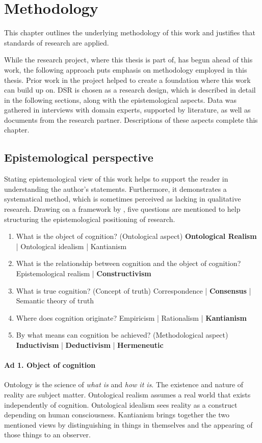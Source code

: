 \chapter{Methodology}
This chapter outlines the underlying methodology of this work and justifies that standards of research are applied. 

While the research project, where this thesis is part of, has begun ahead of this work, the following approach puts emphasis on methodology employed in this thesis. Prior work in the project helped to create a foundation where this work can build up on. \acrfull{DSR} is chosen as a research design, which is described in detail in the following sections, along with the epistemological aspects. Data was gathered in interviews with domain experts, supported by literature, as well as documents from the research partner. Descriptions of these aspects complete this chapter. 


	\section{Epistemological perspective}
Stating epistemological view of this work helps to support the reader in understanding the author's statements. Furthermore, it demonstrates a systematical method, which is sometimes perceived as lacking in qualitative research. Drawing on a framework by \cite{becker2007epistemological}, five questions are mentioned to help structuring the epistemological positioning of research.

\begin{enumerate}
	\item What is the object of cognition? (Ontological aspect)
		\subitem \textbf{Ontological Realism} | Ontological idealism  | Kantianism
	\item What is the relationship between cognition and the object of cognition?
		\subitem Epistemological realism | \textbf{Constructivism}
	\item What is true cognition? (Concept of truth)
		\subitem Correspondence |  \textbf{Consensus} |  Semantic theory of truth
	\item Where does cognition originate?
	\subitem Empiricism | Rationalism | \textbf{Kantianism}
	\item By what means can cognition be achieved? (Methodological aspect)
		\subitem \textbf{Inductivism} | \textbf{Deductivism} | \textbf{Hermeneutic}
\end{enumerate}
\subsubsection{Ad 1. Object of cognition}
Ontology is the science of \textit{what is} and \textit{how it is}. The existence and nature of reality are subject matter. Ontological realism assumes a real world that exists independently of cognition. Ontological idealism sees reality as a construct depending on human consciousness. Kantianism brings together the two mentioned views by distinguishing in things in themselves and the appearing of those things to an observer. 


